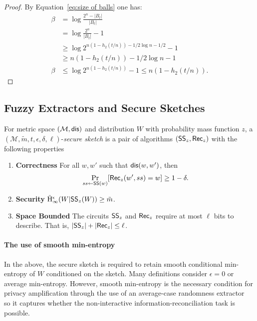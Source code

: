 \begin{proof}
By Equation~\ref{eq:size of balls} one has: 
\begin{align*}
\beta &= \log{\frac{2^n - |B_t|}{|B_t|}} \\&= \log{\frac{2^n}{|B_t|} -1} \\&\ge \log{2^{n(1-h_2(t/n)) - 1/2 \log{n}-1/2} -1} \\&\ge n(1-h_2(t/n)) - 1/2\log{n}-1\\
\beta&\le \log{2^{n(1-h_2(t/n))} -1} \le n(1-h_2(t/n)).
\end{align*}
\end{proof}


    \subsection{Fuzzy Extractors and Secure Sketches}
\begin{definition}
For metric space $(\mathcal{M}, \mathsf{dis})$ and distribution $W$ with probability mass function $z$, a $(\mathcal{M}, \tilde{m}, t, \epsilon, \delta, \ell)$-\emph{secure sketch} is a pair of algorithms $({\mathsf{SS}}_z, {\mathsf{Rec}}_z)$ with the following properties 
\begin{enumerate} 
\itemsep0em
\item \textbf{Correctness} For all $w, w'$ such that $\mathsf{dis}(w, w')$, then \[\Pr_{ss \leftarrow {\ensuremath{\mathsf{SS}}}(w)}[{\mathsf{Rec}}_z(w', ss) = w]\ge 1-\delta.\]
\item \textbf{Security}  $\tilde{\mathrm{H}}_\infty^\epsilon(W | {\mathsf{SS}}_z(W)) \ge \tilde{m}$.
\item \textbf{Space Bounded} The circuits ${\mathsf{SS}}_z$ and ${\mathsf{Rec}}_z$ require at most $\ell$ bits to describe.  That is, $|{\mathsf{SS}}_z| +|{\mathsf{Rec}}_z|\le \ell$.
\end{enumerate}
\end{definition}

\paragraph{The use of smooth min-entropy} In the above, the secure sketch is required to retain smooth conditional min-entropy of $W$ conditioned on the sketch.  Many definitions consider $\epsilon=0$ or average min-entropy.  However, smooth min-entropy is the necessary condition for privacy amplification through the use of an average-case randomness extractor~\cite{renner2005simple} so it captures whether the non-interactive information-reconciliation task is possible. 

